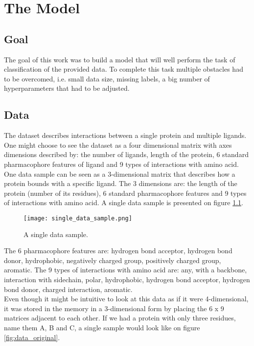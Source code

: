 \documentclass[a4paper,10pt]{report}
\begin{document}
	
  \chapter{The Model}\label{chap:OUR_MODEL}
      
      \section{Goal}
      The goal of this work was to build a model that will well perform the task of classification of the provided data. To complete this task multiple obstacles had to be overcomed, i.e. small data size, missing labels, a big number of hyperparameters that had to be adjusted.\\
     
	 
      
      \section{Data}\label{sec:OUR_DATA}
	The dataset describes interactions between a single protein and multiple ligands. One might choose to see the dataset as a four dimensional matrix with axes dimensions described by: the number of ligands, length of the protein, 6 standard pharmacophore features of ligand and 9 types of interactions with amino acid\cite{2DSIFT}. One data sample can be seen as a 3-dimensional matrix that describes how a protein bounds with a specific ligand. The 3 dimensions are: the length of the protein (number of its residues), 6 standard pharmacophore features and 9 types of interactions with amino acid. A single data sample is presented on figure \ref{fig:single_data_sample2}.\\
	
	\begin{figure}[h!]
	  \centering
	  \texttt{[image: single\_data\_sample.png]}
	  \caption{A single data sample.}
	  \label{fig:single_data_sample2}
	\end{figure} 
	
	The 6 pharmacophore features are: hydrogen bond acceptor, hydrogen bond donor, hydrophobic, negatively charged group, positively charged group, aromatic. The 9 types of interactions with amino acid are: any, with a backbone, interaction with sidechain, polar, hydrophobic, hydrogen bond acceptor, hydrogen bond donor, charged interaction, aromatic.\\
	
	Even though it might be intuitive to look at this data as if it were 4-dimensional, it was stored in the memory in a 3-dimensional form by placing the 6 x 9 matrices adjacent to each other. If we had a protein with only three residues, name them A, B and C, a single sample would look like on figure \ref{fig:data_original}.\\
	
\end{document}
